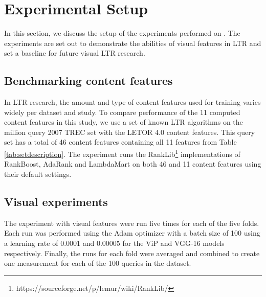 
\section{Experimental Setup}\label{sec:experiments}
In this section, we discuss the setup of the experiments performed on \datasetname. The experiments are set out to demonstrate the abilities of visual features in LTR and set a baseline for future visual LTR research.


\subsection{Benchmarking content features}
In LTR research, the amount and type of content features used for training varies widely per dataset and study. To compare performance of the 11 computed content features in this study, we use a set of known LTR algorithms on the million query 2007 TREC set with the LETOR 4.0 content features. This query set has a total of 46 content features containing all 11 features from Table \ref{tab:setdescription}. The experiment runs the RankLib\footnote{https://sourceforge.net/p/lemur/wiki/RankLib/} implementations of RankBoost, AdaRank and LambdaMart on both 46 and 11 content features using their default settings. 

\subsection{Visual experiments}
The experiment with visual features were run five times for each of the five folds. Each run was performed using the Adam optimizer with a batch size of 100 using a learning rate of $0.0001$ and $0.00005$ for the ViP and VGG-16 models respectively. Finally, the runs for each fold were averaged and combined to create one measurement for each of the 100 queries in the dataset. 

